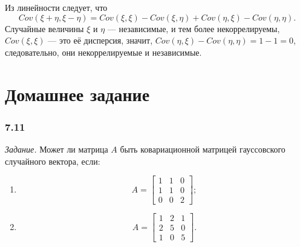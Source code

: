 Из линейности следует,
что
$$Cov \left( \xi + \eta, \xi - \eta \right) =
  Cov \left( \xi, \xi \right) - Cov \left( \xi, \eta \right) +
  Cov \left( \eta, \xi \right) - Cov \left( \eta, \eta \right).$$
Случайные величины $ \xi $ и $ \eta $ --- независимые, и тем более некоррелируемы,
$Cov \left( \xi, \xi \right) $ --- это её дисперсия, значит,
$Cov \left( \eta, \xi \right) - Cov \left( \eta, \eta \right) = 1 - 1 = 0$, следовательно,
они некоррелируемые и независимые.

\section*{Домашнее задание}

\subsubsection*{7.11}

\textit{Задание.}
Может ли матрица $A$ быть ковариационной матрицей гауссовского случайного вектора, если:
\begin{enumerate}[label=\alph*)]
  \item $$A =
    \begin{bmatrix}
      1 & 1 & 0 \\
      1 & 1 & 0 \\
      0 & 0 & 2
    \end{bmatrix};$$
  \item $$A =
    \begin{bmatrix}
      1 & 2 & 1 \\
      2 & 5 & 0 \\
      1 & 0 & 5
    \end{bmatrix}.$$
\end{enumerate}

